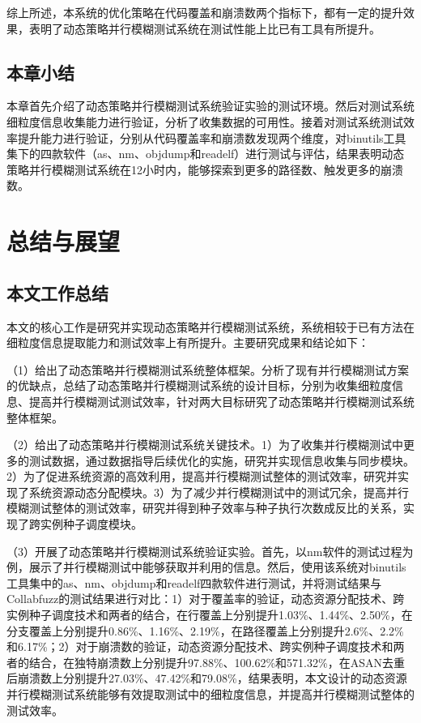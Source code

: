 \documentclass[master]{thesis-uestc}
\begin{document}
综上所述，本系统的优化策略在代码覆盖和崩溃数两个指标下，都有一定的提升效果，表明了动态策略并行模糊测试系统在测试性能上比已有工具有所提升。

\section{本章小结}

本章首先介绍了动态策略并行模糊测试系统验证实验的测试环境。然后对测试系统细粒度信息收集能力进行验证，分析了收集数据的可用性。接着对测试系统测试效率提升能力进行验证，分别从代码覆盖率和崩溃数发现两个维度，对binutils工具集下的四款软件（as、nm、objdump和readelf）进行测试与评估，结果表明动态策略并行模糊测试系统在12小时内，能够探索到更多的路径数、触发更多的崩溃数。 

\chapter{总结与展望}

\section{本文工作总结}

本文的核心工作是研究并实现动态策略并行模糊测试系统，系统相较于已有方法在细粒度信息提取能力和测试效率上有所提升。主要研究成果和结论如下：

（1）给出了动态策略并行模糊测试系统整体框架。分析了现有并行模糊测试方案的优缺点，总结了动态策略并行模糊测试系统的设计目标，分别为收集细粒度信息、提高并行模糊测试测试效率，针对两大目标研究了动态策略并行模糊测试系统整体框架。

（2）给出了动态策略并行模糊测试系统关键技术。1）为了收集并行模糊测试中更多的测试数据，通过数据指导后续优化的实施，研究并实现信息收集与同步模块。2）为了促进系统资源的高效利用，提高并行模糊测试整体的测试效率，研究并实现了系统资源动态分配模块。3）为了减少并行模糊测试中的测试冗余，提高并行模糊测试整体的测试效率，研究并得到种子效率与种子执行次数成反比的关系，实现了跨实例种子调度模块。

（3）开展了动态策略并行模糊测试系统验证实验。首先，以nm软件的测试过程为例，展示了并行模糊测试中能够获取并利用的信息。然后，使用该系统对binutils工具集中的as、nm、objdump和readelf四款软件进行测试，并将测试结果与Collabfuzz的测试结果进行对比：1）对于覆盖率的验证，动态资源分配技术、跨实例种子调度技术和两者的结合，在行覆盖上分别提升1.03\%、1.44\%、2.50\%，在分支覆盖上分别提升0.86\%、1.16\%、2.19\%，在路径覆盖上分别提升2.6\%、2.2\%和6.17\%；2）对于崩溃数的验证，动态资源分配技术、跨实例种子调度技术和两者的结合，在独特崩溃数上分别提升97.88\%、100.62\%和571.32\%，在ASAN去重后崩溃数上分别提升27.03\%、47.42\%和79.08\%，结果表明，本文设计的动态资源并行模糊测试系统能够有效提取测试中的细粒度信息，并提高并行模糊测试整体的测试效率。
\end{document}
